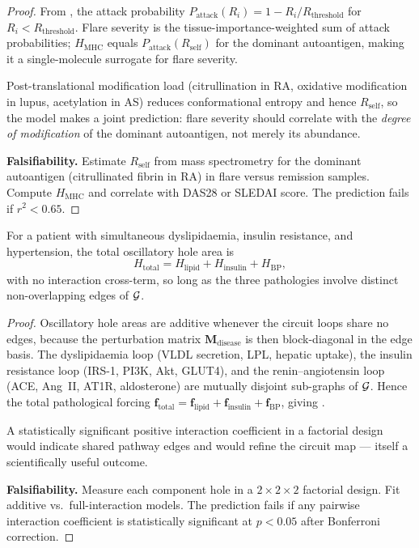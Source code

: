 \begin{proof}
From , the attack probability
$P_{\mathrm{attack}}(R_i) = 1 - R_i/R_{\mathrm{threshold}}$ for
$R_i < R_{\mathrm{threshold}}$.  Flare severity is the tissue-importance-weighted
sum of attack probabilities; $H_{\mathrm{MHC}}$ equals
$P_{\mathrm{attack}}(R_{\mathrm{self}})$ for the dominant autoantigen, making
it a single-molecule surrogate for flare severity.

Post-translational modification load (citrullination in RA, oxidative
modification in lupus, acetylation in AS) reduces conformational entropy and
hence $R_{\mathrm{self}}$, so the model makes a joint prediction: flare
severity should correlate with the \emph{degree of modification} of the
dominant autoantigen, not merely its abundance.

\textbf{Falsifiability.}  Estimate $R_{\mathrm{self}}$ from mass spectrometry
for the dominant autoantigen (citrullinated fibrin in RA) in flare versus
remission samples.  Compute $H_{\mathrm{MHC}}$ and correlate with DAS28 or
SLEDAI score.  The prediction fails if $r^2 < 0.65$.
\end{proof}

\begin{theorem}
\label{thm:ch07-P5}
For a patient with simultaneous dyslipidaemia, insulin resistance, and
hypertension, the total oscillatory hole area is
\begin{equation}
  H_{\mathrm{total}}
  = H_{\mathrm{lipid}} + H_{\mathrm{insulin}} + H_{\mathrm{BP}},
  \label{eq:ch07-P5-additivity}
\end{equation}
with no interaction cross-term, so long as the three pathologies involve
distinct non-overlapping edges of $\mathcal{G}$.
\end{theorem}

\begin{proof}
Oscillatory hole areas are additive whenever the circuit loops share no edges,
because the perturbation matrix $\mathbf{M}_{\mathrm{disease}}$ is then
block-diagonal in the edge basis.  The dyslipidaemia loop (VLDL secretion,
LPL, hepatic uptake), the insulin resistance loop (IRS-1, PI3K, Akt, GLUT4),
and the renin--angiotensin loop (ACE, Ang~II, AT1R, aldosterone) are mutually
disjoint sub-graphs of $\mathcal{G}$.  Hence the total pathological forcing
$\mathbf{f}_{\mathrm{total}} = \mathbf{f}_{\mathrm{lipid}} +
\mathbf{f}_{\mathrm{insulin}} + \mathbf{f}_{\mathrm{BP}}$, giving
.

A statistically significant positive interaction coefficient in a factorial
design would indicate shared pathway edges and would refine the circuit map —
itself a scientifically useful outcome.

\textbf{Falsifiability.}  Measure each component hole in a $2\times 2\times 2$
factorial design.  Fit additive vs.\ full-interaction models.  The prediction
fails if any pairwise interaction coefficient is statistically significant at
$p < 0.05$ after Bonferroni correction.
\end{proof}

